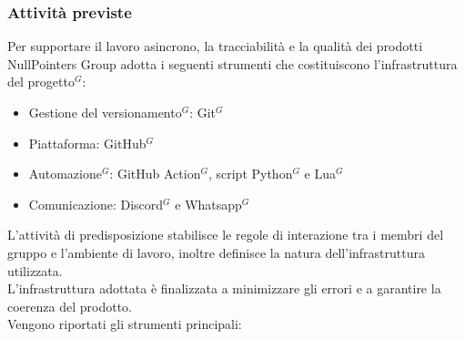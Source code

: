 \subsubsection{Attività previste}
Per supportare il lavoro asincrono, la tracciabilità e la qualità dei prodotti NullPointers Group adotta i seguenti strumenti che costituiscono l’infrastruttura del progetto$^G$:
\begin{itemize}[itemsep=3pt, parsep=1pt, label=$\scriptstyle\bullet$]
    \item Gestione del versionamento$^G$: Git$^G$
    \item Piattaforma: GitHub$^G$
    \item Automazione$^G$: GitHub Action$^G$, script Python$^G$ e Lua$^G$
    \item Comunicazione: Discord$^G$ e Whatsapp$^G$
\end{itemize}

L’attività di predisposizione stabilisce le regole di interazione tra i membri del gruppo e l’ambiente di lavoro, inoltre definisce la natura dell’infrastruttura utilizzata.\\
L’infrastruttura adottata è finalizzata a minimizzare gli errori e a garantire la coerenza del prodotto.\\
Vengono riportati gli strumenti principali:

